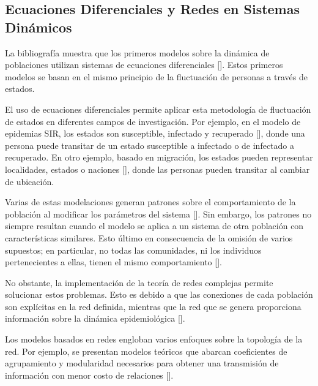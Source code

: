 \documentclass[../main.tex]{subfiles}
\begin{document}


\subsection{Ecuaciones Diferenciales y Redes en Sistemas Dinámicos}


La bibliografía muestra que los primeros modelos sobre la dinámica de poblaciones utilizan sistemas de ecuaciones diferenciales [\cite{MT_MAY,royanderson1992,Dimitrova2000}]. Estos primeros modelos se basan en el mismo principio de la fluctuación de personas a través de estados. 

El uso de ecuaciones diferenciales permite aplicar esta metodología de fluctuación de estados en diferentes campos de investigación. Por ejemplo,  en el modelo de epidemias SIR, los estados son susceptible, infectado y recuperado [\cite{royanderson1992}], donde una persona puede transitar de un estado susceptible a infectado o de infectado a recuperado. En otro ejemplo, basado en migración, los estados pueden representar localidades, estados o naciones [\cite{Dimitrova2000,MT_MAY,Olsson1965}], donde las personas pueden transitar al cambiar de ubicación. 

Varias de estas modelaciones generan patrones sobre el comportamiento de la población al modificar los parámetros del sistema [\cite{Dimitrova2000}]. 
Sin embargo, los patrones no siempre resultan cuando el modelo se aplica a un sistema de otra población con características similares. Esto último en consecuencia de la  omisión de varios supuestos; en particular, no todas las comunidades, ni los individuos pertenecientes a ellas, tienen el mismo comportamiento [\cite{Keeling2005}].

No obstante, la implementación de la teoría de redes complejas permite solucionar estos problemas. Esto es debido a que las conexiones de cada población son explícitas en la red definida, mientras que la red que se genera proporciona información sobre la dinámica epidemiológica [\cite{danon2011networks}]. 

Los modelos basados en redes engloban varios enfoques sobre la topología de la red. Por ejemplo, se presentan modelos teóricos que abarcan coeficientes de agrupamiento y modularidad necesarios para obtener una transmisión de información con menor costo de relaciones [\cite{Watts1998, Nematzadeh2014}].
\end{document}
